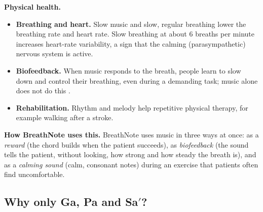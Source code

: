 \documentclass[12pt,a4paper]{article}
\newcommand{\Sah}{Sa\ensuremath{'}}     %
\begin{document}
\textbf{Physical health.}
\begin{itemize}
  \item \textbf{Breathing and heart.} Slow music and slow, regular breathing lower the breathing rate and heart rate. Slow breathing at about 6 breaths per minute increases heart-rate variability, a sign that the calming (parasympathetic) nervous system is active.
  \item \textbf{Biofeedback.} When music responds to the breath, people learn to slow down and control their breathing, even during a demanding task; music alone does not do this \cite{bhandari}.
  \item \textbf{Rehabilitation.} Rhythm and melody help repetitive physical therapy, for example walking after a stroke.
\end{itemize}

\textbf{How BreathNote uses this.} BreathNote uses music in three ways at once: as a \emph{reward} (the chord builds when the patient succeeds), as \emph{biofeedback} (the sound tells the patient, without looking, how strong and how steady the breath is), and as a \emph{calming sound} (calm, consonant notes) during an exercise that patients often find uncomfortable.

\subsection{Why only Ga, Pa and \Sah?}
\label{sec:whyonly}
\end{document}
